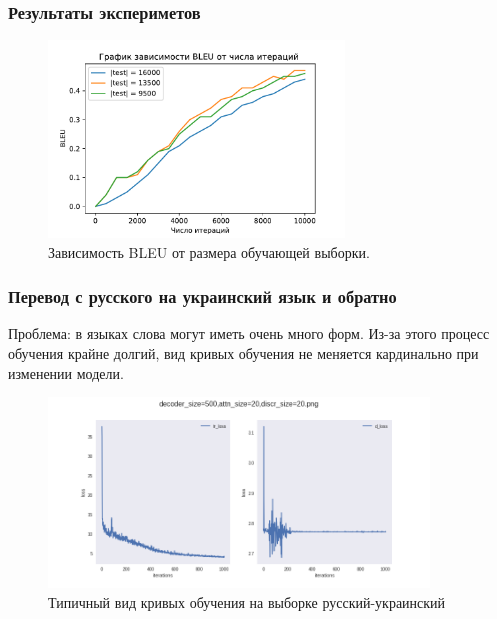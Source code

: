\documentclass[10pt,pdf,hyperref={unicode}]{beamer}
\begin{document}
\begin{frame}
	\frametitle{Результаты экспериметов}
	
	\begin{figure}[h]
		\centering
		\includegraphics[width=0.7\textwidth]{volume}
		\caption{Зависимость BLEU от размера обучающей выборки.}
	\end{figure}
	
\end{frame}

\begin{frame}
\frametitle{Перевод с русского на украинский язык и обратно} 
\begin{center}
	Проблема: в языках слова могут иметь очень много форм. Из-за этого процесс обучения крайне долгий, вид кривых обучения не меняется кардинально при изменении модели.
	
	\begin{figure}[h]
		\centering
		\includegraphics[width=0.9\textwidth]{decoder_size=500,attn_size=20,discr_size=20}
		\caption{Типичный вид кривых обучения на выборке русский-украинский}
	\end{figure}
	
\end{center}
\end{frame}
\end{document}
